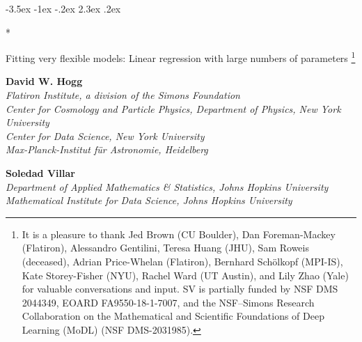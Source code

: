 \documentclass[12pt,letterpaper]{article}
\makeatletter
\renewcommand\section{\@startsection {section}{1}{\z@}%
  {-3.5ex \@plus -1ex \@minus -.2ex}%
  {2.3ex \@plus.2ex}%
  {\raggedright\normalfont\Large\bfseries}}
\makeatother
\begin{document}
\thispagestyle{plain}

\section*{\raggedright Fitting very flexible models: Linear regression with large numbers of parameters%
\footnote{%
It is a pleasure to thank
Jed Brown (CU Boulder),
Dan Foreman-Mackey (Flatiron),
Alessandro Gentilini,
Teresa Huang (JHU),
Sam Roweis (deceased),
Adrian Price-Whelan (Flatiron),
Bernhard Sch\"olkopf (MPI-IS),
Kate Storey-Fisher (NYU),
Rachel Ward (UT Austin), and
Lily Zhao (Yale)
for valuable conversations and input.
SV is partially funded by NSF DMS 2044349, EOARD FA9550-18-1-7007, and the NSF--Simons Research Collaboration on the Mathematical and Scientific Foundations of Deep Learning (MoDL) (NSF DMS-2031985).}}

\noindent
\textbf{David W. Hogg} \\
\textsl{\footnotesize Flatiron Institute, a division of the Simons Foundation \\
Center for Cosmology and Particle Physics, Department of Physics, New York University \\
Center for Data Science, New York University \\
Max-Planck-Institut f\"ur Astronomie, Heidelberg}

\medskip
\noindent
\textbf{Soledad Villar} \\
\textsl{\footnotesize Department of Applied Mathematics \& Statistics, Johns Hopkins University \\
Mathematical Institute for Data Science, Johns Hopkins University}
\end{document}
